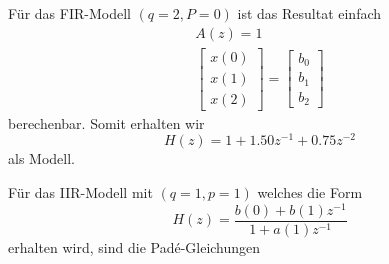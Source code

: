 Für das FIR-Modell $(q=2,P=0)$ ist das Resultat einfach
\begin{equation}\begin{array}{r}
A(z)=1 \\
{\left[\begin{array}{l}
	x(0) \\
	x(1) \\
	x(2)
	\end{array}\right]=\left[\begin{array}{l}
	b_0 \\
	b_1 \\
	b_2
	\end{array}\right]}
\end{array}\end{equation} 
berechenbar.
Somit erhalten wir 
\begin{equation}
H(z)=1+1.50 z^{-1}+0.75 z^{-2}
\end{equation}
als Modell.

Für das IIR-Modell mit $(q=1,p=1)$ welches die Form
\begin{equation}
H(z)=\frac{b(0)+b(1) z^{-1}}{1+a(1) z^{-1}}
\end{equation}
erhalten wird, sind die Padé-Gleichungen

